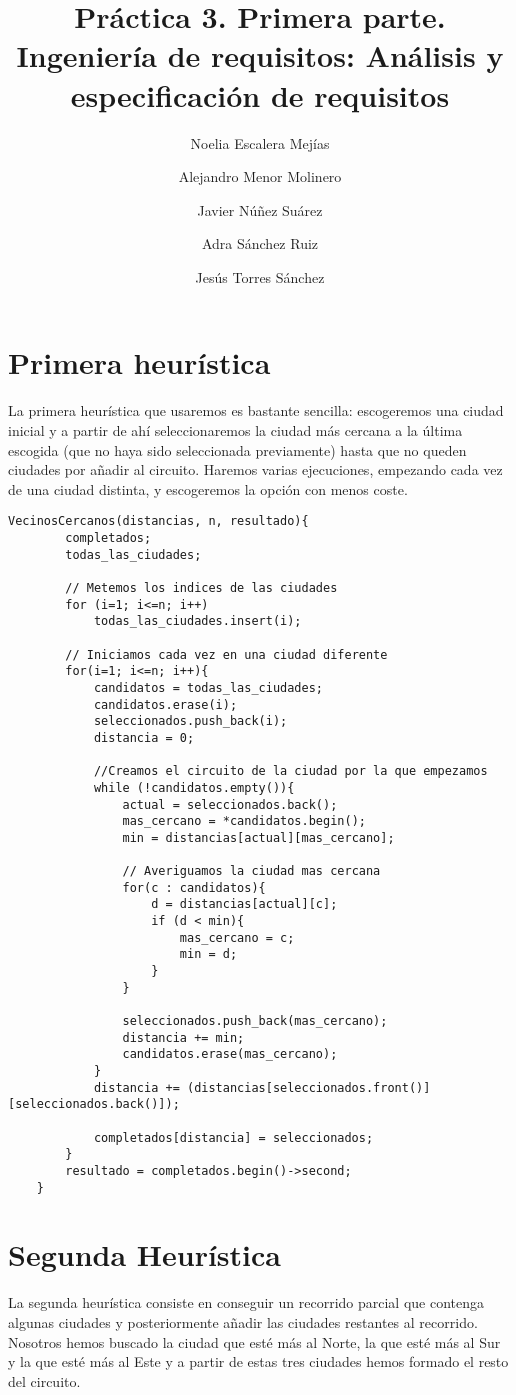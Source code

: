 \documentclass{article}
\title{Práctica 3. Primera parte. Ingeniería de requisitos: Análisis y especificación de requisitos}
\author{Noelia Escalera Mejías\\
	\and Alejandro Menor Molinero\\
	\and Javier Núñez Suárez\\
	\and Adra Sánchez Ruiz\\
	\and Jesús Torres Sánchez}
\begin{document}
	\maketitle
	
	\section{Primera heurística}
	La primera heurística que usaremos es bastante sencilla: escogeremos una ciudad inicial y a partir de ahí seleccionaremos la ciudad más cercana a la última escogida (que no haya sido seleccionada previamente) hasta que no queden ciudades por añadir al circuito. Haremos varias ejecuciones, empezando cada vez de una ciudad distinta, y escogeremos la opción con menos coste.
	
	\begin{lstlisting}[caption=Pseudocódigo de la primera heurística]
	VecinosCercanos(distancias, n, resultado){
		completados;
		todas_las_ciudades;
		
		// Metemos los indices de las ciudades
		for (i=1; i<=n; i++)
			todas_las_ciudades.insert(i);
			
		// Iniciamos cada vez en una ciudad diferente
		for(i=1; i<=n; i++){
			candidatos = todas_las_ciudades;
			candidatos.erase(i);
			seleccionados.push_back(i);
			distancia = 0;
			
			//Creamos el circuito de la ciudad por la que empezamos
			while (!candidatos.empty()){
				actual = seleccionados.back();
				mas_cercano = *candidatos.begin();
				min = distancias[actual][mas_cercano];
				
				// Averiguamos la ciudad mas cercana
				for(c : candidatos){
					d = distancias[actual][c];
					if (d < min){
						mas_cercano = c;
						min = d;
					}
				}
				
				seleccionados.push_back(mas_cercano);
				distancia += min;
				candidatos.erase(mas_cercano);
			}
			distancia += (distancias[seleccionados.front()][seleccionados.back()]);
			
			completados[distancia] = seleccionados;
		}
		resultado = completados.begin()->second;
	}
	\end{lstlisting}
	\section{Segunda Heurística}
	La segunda heurística consiste en conseguir un recorrido parcial que contenga algunas ciudades y posteriormente añadir las ciudades restantes al recorrido. Nosotros hemos buscado la ciudad que esté más al Norte, la que esté más al Sur y la que esté más al Este y a partir de estas tres ciudades hemos formado el resto del circuito.
	
\end{document}
